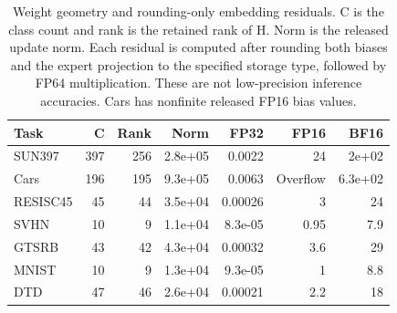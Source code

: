 \begin{table}[!htbp]
\centering
\small
\setlength{\tabcolsep}{3pt}
\caption{Weight geometry and rounding-only embedding residuals. C is the class count and rank is the retained rank of H. Norm is the released update norm. Each residual is computed after rounding both biases and the expert projection to the specified storage type, followed by FP64 multiplication. These are not low-precision inference accuracies. Cars has nonfinite released FP16 bias values.}
\label{tab:precision}
\begin{tabular}{lrrrrrr}
\toprule
Task & C & Rank & Norm & FP32 & FP16 & BF16 \\
\midrule
SUN397 & 397 & 256 & 2.8e+05 & 0.0022 & 24 & 2e+02 \\
Cars & 196 & 195 & 9.3e+05 & 0.0063 & Overflow & 6.3e+02 \\
RESISC45 & 45 & 44 & 3.5e+04 & 0.00026 & 3 & 24 \\
SVHN & 10 & 9 & 1.1e+04 & 8.3e-05 & 0.95 & 7.9 \\
GTSRB & 43 & 42 & 4.3e+04 & 0.00032 & 3.6 & 29 \\
MNIST & 10 & 9 & 1.3e+04 & 9.3e-05 & 1 & 8.8 \\
DTD & 47 & 46 & 2.6e+04 & 0.00021 & 2.2 & 18 \\
\bottomrule
\end{tabular}
\end{table}
